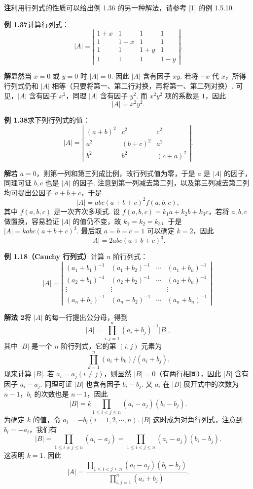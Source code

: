 \documentclass[UTF8, 12pt, fontset=fandol, oneside]{ctexart}
\begin{document}
\noindent\textbf{注}\quad 利用行列式的性质可以给出例 1.36 的另一种解法，请参考 [1] 的例 1.5.10.

\noindent\textbf{例 1.37}\quad 计算行列式：
\[
|A|=\left|\begin{array}{cccc}
1+x & 1 & 1 & 1\\
1 & 1-x & 1 & 1\\
1 & 1 & 1+y & 1\\
1 & 1 & 1 & 1-y
\end{array}\right|.
\]

\noindent\textbf{解}\quad 显然当 $x=0$ 或 $y=0$ 时 $|A|=0$. 因此 $|A|$ 含有因子 $xy$. 若将 $-x$ 代 $x$，所得行列式仍和 $|A|$ 相等（只要将第一、第二行对换，再将第一、第二列对换）. 可见，$|A|$ 含有因子 $x^2$，同理 $|A|$ 含有因子 $y^2$. 而 $x^2y^2$ 项的系数是 $1$，因此
\[
|A|=x^2y^2.
\]

\noindent\textbf{例 1.38}\quad 求下列行列式的值：
\[
|A|=\left|\begin{array}{ccc}
(a+b)^2 & c^2 & c^2\\
a^2 & (b+c)^2 & a^2\\
b^2 & b^2 & (c+a)^2
\end{array}\right|.
\]

\noindent\textbf{解}\quad 若 $a=0$，则第一列和第三列成比例，故行列式值为零，于是 $a$ 是 $|A|$ 的因子，同理可证 $b,c$ 也是 $|A|$ 的因子. 注意到第一列减去第二列，以及第三列减去第二列均可提出公因子 $a+b+c$，于是
\[
|A|=abc(a+b+c)^2f(a,b,c),
\]
其中 $f(a,b,c)$ 是一次齐次多项式. 设 $f(a,b,c)=k_1a+k_2b+k_3c$，若将 $a,b,c$ 做置换，容易验证 $|A|$ 的值仍不变，故 $k_1=k_2=k_3$，于是 $|A|=kabc(a+b+c)^3$. 最后取 $a=b=c=1$ 可以确定 $k=2$，因此
\[
|A|=2abc(a+b+c)^3.
\]

\noindent\textbf{例 1.18（Cauchy 行列式）}\quad 计算 $n$ 阶行列式：
\[
|A|=\left|\begin{array}{cccc}
(a_1+b_1)^{-1} & (a_1+b_2)^{-1} & \cdots & (a_1+b_n)^{-1}\\
(a_2+b_1)^{-1} & (a_2+b_2)^{-1} & \cdots & (a_2+b_n)^{-1}\\
\vdots & \vdots &        & \vdots\\
(a_n+b_1)^{-1} & (a_n+b_2)^{-1} & \cdots & (a_n+b_n)^{-1}
\end{array}\right|.
\]

\noindent\textbf{解法 2}\quad 将 $|A|$ 的每一行提出公分母，得到
\[
|A|=\prod_{i,j=1}^n(a_i+b_j)^{-1}|B|,
\]
其中 $|B|$ 是一个 $n$ 阶行列式，它的第 $(i,j)$ 元素为
\[
\prod_{k=1}^n(a_i+b_k)/(a_i+b_j).
\]
现来计算 $|B|$. 若 $a_i=a_j(i\ne j)$，则显然 $|B|=0$（有两行相同），因此 $|B|$ 含有因子 $a_i-a_j$. 同理可证 $|B|$ 也含有因子 $b_i-b_j$. 又 $a_i$ 在 $|B|$ 展开式中的次数为 $n-1$，$b_i$ 的次数也是 $n-1$，因此
\[
|B|=k\prod_{1\le i<j\le n}(a_i-a_j)(b_i-b_j).
\]
为确定 $k$ 的值，令 $a_i=-b_i(i=1,2,\cdots,n)$. $|B|$ 这时成为对角行列式，注意到 $b_i=-a_i$，我们有
\[
|B|=\prod_{1\le i\ne j\le n}(a_i-a_j)
=\prod_{1\le i<j\le n}(a_i-a_j)(b_i-b_j).
\]
这表明 $k=1$. 因此
\[
|A|=\frac{\prod_{1\le i<j\le n}(a_i-a_j)(b_i-b_j)}
{\prod_{i,j=1}^n(a_i+b_j)}.
\]
\end{document}
